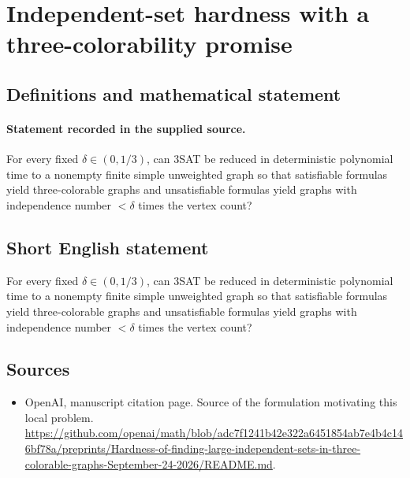 \documentclass[11pt]{article}
\begin{document}
\section*{Independent-set hardness with a three-colorability promise}\label{30007487}
\subsection{Definitions and mathematical statement}
\paragraph{Statement recorded in the supplied source.}
For every fixed $\delta \in (0,1/3)$, can 3SAT be reduced in deterministic polynomial time to a nonempty finite simple unweighted graph so that satisfiable formulas yield three-colorable graphs and unsatisfiable formulas yield graphs with independence number $<\delta $ times the vertex count?
\subsection{Short English statement}
For every fixed $\delta \in (0,1/3)$, can 3SAT be reduced in deterministic polynomial time to a nonempty finite simple unweighted graph so that satisfiable formulas yield three-colorable graphs and unsatisfiable formulas yield graphs with independence number $<\delta $ times the vertex count?
\subsection{Sources}
\begin{itemize}
\item[S1] OpenAI, manuscript citation page. Source of the formulation motivating this local problem.
\url{https://github.com/openai/math/blob/adc7f1241b42e322a6451854ab7e4b4c146bf78a/preprints/Hardness-of-finding-large-independent-sets-in-three-colorable-graphs-September-24-2026/README.md}.
\end{itemize}
\end{document}
